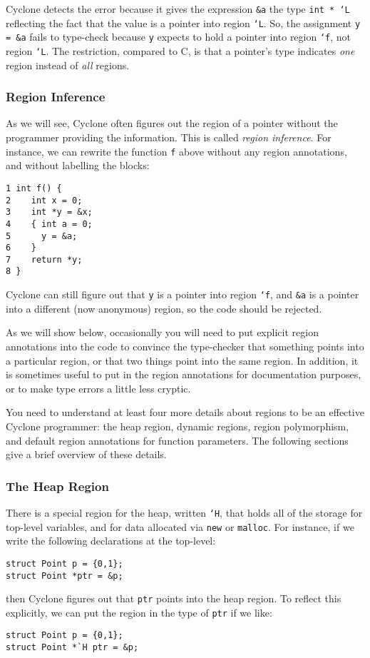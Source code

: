 Cyclone detects the error because it gives the expression \texttt{\&a} the
type \texttt{int * `L} reflecting the fact that the value is
a pointer into region \texttt{`L}.  So, the assignment 
\texttt{y = \&a} fails to type-check because \texttt{y} expects
to hold a pointer into region \texttt{`f}, not region \texttt{`L}.
The restriction, compared to C, is that a pointer's type indicates
\emph{one} region instead of \emph{all} regions.

\subsubsection*{Region Inference}

As we will see, Cyclone often figures out the region of a pointer
without the programmer providing the information.  This is called {\em
region inference}.  For instance, we can rewrite the function
\texttt{f} above without any region annotations, and without 
labelling the blocks:
\begin{verbatim}
1 int f() {
2    int x = 0;
3    int *y = &x;
4    { int a = 0;
5      y = &a;
6    }
7    return *y;
8 }
\end{verbatim}
Cyclone can still figure out that \texttt{y} is a pointer into
region \texttt{`f}, and \texttt{\&a} is a pointer into a different
(now anonymous) region, so the code should be rejected.

As we will show below, occasionally you will need to put explicit
region annotations into the code to convince the type-checker that
something points into a particular region, or that two things point
into the same region.  In addition, it is sometimes useful to put in
the region annotations for documentation purposes, or to make type
errors a little less cryptic.

You need to understand at least four more details about regions to
be an effective Cyclone programmer:  the heap region, dynamic
regions, region polymorphism, and default region annotations for
function parameters.  The following sections give a brief overview
of these details.

\subsubsection*{The Heap Region}

There is a special region for the heap, written \texttt{`H}, that
holds all of the storage for top-level variables, and for data
allocated via \texttt{new} or \texttt{malloc}.  For instance, if we
write the following declarations at the top-level:
\begin{verbatim}
struct Point p = {0,1};
struct Point *ptr = &p;
\end{verbatim}
then Cyclone figures out that \texttt{ptr} points into the heap
region.  To reflect this explicitly, we can put the region in
the type of \texttt{ptr} if we like:
\begin{verbatim}
struct Point p = {0,1};
struct Point *`H ptr = &p;
\end{verbatim}

